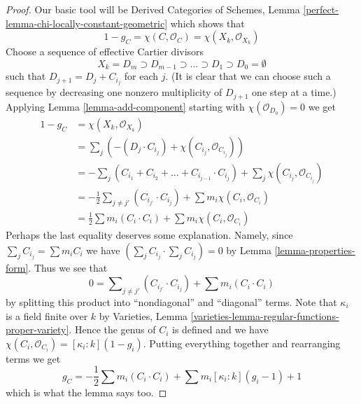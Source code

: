 \documentclass[10pt,a4paper]{amsart}
\theoremstyle{plain}
\theoremstyle{definition}
\theoremstyle{remark}
\numberwithin{equation}{subsection}
\begin{document}
\begin{proof}
Our basic tool will be Derived Categories of Schemes, Lemma
\ref{perfect-lemma-chi-locally-constant-geometric}
which shows that
$$
1 - g_C = \chi(C, \mathcal{O}_C) =
\chi(X_k, \mathcal{O}_{X_k})
$$
Choose a sequence of effective Cartier divisors
$$
X_k = D_m \supset D_{m - 1} \supset \ldots \supset D_1 \supset D_0 = \emptyset
$$
such that $D_{j + 1} = D_j + C_{i_j}$ for each $j$. (It is clear that
we can choose such a sequence by decreasing one nonzero multiplicity
of $D_{j + 1}$ one step at a time.) Applying Lemma \ref{lemma-add-component}
starting with $\chi(\mathcal{O}_{D_0}) = 0$ we get
\begin{align*}
1 - g_C
& =
\chi(X_k, \mathcal{O}_{X_k}) \\
& =
\sum\nolimits_j
\left(-(D_j \cdot C_{i_j}) +  \chi(C_{i_j}, \mathcal{O}_{C_{i_j}})\right) \\
& =
- \sum\nolimits_j
(C_{i_1} + C_{i_2} + \ldots + C_{i_{j - 1}} \cdot C_{i_j}) +
\sum\nolimits_j \chi(C_{i_j}, \mathcal{O}_{C_{i_j}}) \\
& =
-\frac{1}{2}\sum\nolimits_{j \not = j'} (C_{i_{j'}} \cdot C_{i_j}) +
\sum m_i \chi(C_i, \mathcal{O}_{C_i}) \\
& =
\frac{1}{2} \sum m_i(C_i \cdot C_i) + \sum m_i \chi(C_i, \mathcal{O}_{C_i})
\end{align*}
Perhaps the last equality deserves some explanation. Namely, since
$\sum_j C_{i_j} = \sum m_i C_i$ we have
$(\sum_j C_{i_j} \cdot \sum_j C_{i_j}) = 0$ by
Lemma \ref{lemma-properties-form}. Thus we see that
$$
0 = \sum\nolimits_{j \not = j'} (C_{i_{j'}} \cdot C_{i_j}) +
\sum m_i(C_i \cdot C_i)
$$
by splitting this product into ``nondiagonal'' and ``diagonal'' terms.
Note that $\kappa_i$ is a field finite over $k$ by
Varieties, Lemma \ref{varieties-lemma-regular-functions-proper-variety}.
Hence the genus of $C_i$ is defined and we have
$\chi(C_i, \mathcal{O}_{C_i}) = [\kappa_i : k](1 - g_i)$.
Putting everything together and rearranging terms we get
$$
g_C = - \frac{1}{2}\sum m_i(C_i \cdot C_i) +
\sum m_i[\kappa_i : k](g_i - 1) + 1
$$
which is what the lemma says too.
\end{proof}
\end{document}
